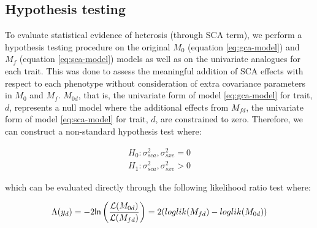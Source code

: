 \subsection{Hypothesis testing}\label{hypothesis-testing}

To evaluate statistical evidence of heterosis (through SCA term), we perform a hypothesis testing procedure on the original \(M_0\) (equation \eqref{eq:gca-model}) and \(M_f\) (equation \eqref{eq:sca-model}) models as well as on the univariate analogues for each trait. This was done to assess the meaningful addition of SCA effects with respect to each phenotype without consideration of extra covariance parameters in \(M_0\) and \(M_f\). \(M_{0d}\), that is, the univariate form of model \eqref{eq:gca-model} for trait, \(d\), represents a null model where the additional effects from \(M_{fd}\), the univariate form of model \eqref{eq:sca-model} for trait, \(d\), are constrained to zero. Therefore, we can construct a non-standard hypothesis test where:

\begin{equation}
\begin{split}
H_0: \sigma^2_{sca}, \sigma^2_{sxe} = 0 \\
H_1: \sigma^2_{sca}, \sigma^2_{sxe} > 0 
\end{split}
\label{eq:hypothesis}
\end{equation}

which can be evaluated directly through the following likelihood ratio test where:

\begin{equation}
\Lambda(y_d) = -2 {\sf ln} \left( \frac{\mathcal{L}(M_{0d})}{\mathcal{L}(M_{fd})} \right) = 2 ( loglik(M_{fd}) - loglik(M_{0d}))
  \label{eq:test}
\end{equation}


